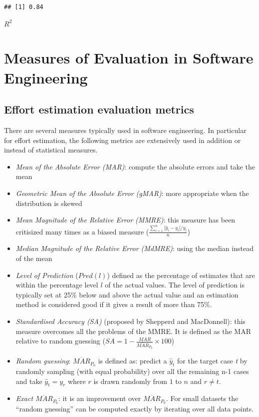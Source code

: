 \documentclass[
]{book}
\begin{document}
\begin{verbatim}
## [1] 0.84
\end{verbatim}

\(R^2\)

\hypertarget{evaluationSE}{%
\chapter{Measures of Evaluation in Software Engineering}\label{evaluationSE}}

\hypertarget{effort-estimation-evaluation-metrics}{%
\section{Effort estimation evaluation metrics}\label{effort-estimation-evaluation-metrics}}

There are several measures typically used in software engineering. In particular for effort estimation, the following metrics are extensively used in addition or instead of statistical measures.

\begin{itemize}
\item
  \emph{Mean of the Absolute Error (MAR)}: compute the absolute errors and take the mean
\item
  \emph{Geometric Mean of the Absolute Error (gMAR)}: more appropriate when the distribution is skewed
\item
  \emph{Mean Magnitude of the Relative Error (MMRE)}: this measure has been critisized many times as a biased measure
  (\(\frac{\sum_{i=1}^{n}{|{\hat{y}_i-y_i}|}/y_i}{n}\))
\item
  \emph{Median Magnitude of the Relative Error (MdMRE)}: using the median instead of the mean
\item
  \emph{Level of Prediction} (\(Pred(l)\)) defined as the percentage of estimates that are within the percentage level \(l\) of the actual values. The level of prediction is typically set at 25\% below and above the actual value and an estimation method is considered good if it gives a result of more than 75\%.
\item
  \emph{Standardised Accuracy (SA)} (proposed by Shepperd and MacDonnell): this measure overcomes all the problems of the MMRE. It is defined as the MAR relative to random guessing
  (\(SA=1-{\frac{MAR}{\overline{MAR}_{P_0}}\times100}\))
\item
  \emph{Random guessing}: \(\overline{MAR}_{P_0}\) is defined as: predict a \(\hat{y}_t\) for the target case \emph{t} by randomly sampling (with equal probability) over all the remaining n-1 cases and take \(\hat{y}_t=y_r\) where \(r\) is drawn randomly from \(1\) to \(n\) and \(r\neq t\).
\item
  \emph{Exact \(\overline{MAR}_{P_0}\)}: it is an improvement over \(\overline{MAR}_{P_0}\). For small datasets the ``random guessing'' can be computed exactly by iterating over all data points.
\end{itemize}
\end{document}
